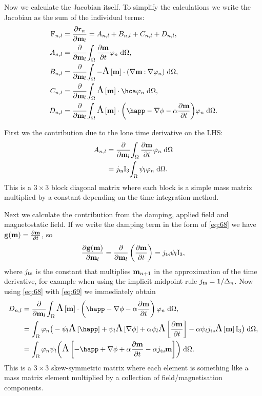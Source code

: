Now we calculate the Jacobian itself. 
To simplify the calculations we write the Jacobian as the sum of the individual terms:
\begin{equation}
  \begin{aligned}
    \Fm_{n,l} &= \pd{\rllgv_n}{\mv_l} = A_{n,l} + B_{n,l} + C_{n,l} + D_{n,l}, \\
    A_{n,l} &= \pd{}{\mv_l} \intd{\dmdt \tbf_n}, \\
    B_{n,l} &= \pd{}{\mv_l} \intd{- \skewm{\mv} \cdot (\grad \mv \compdot \grad \tbf_n)}, \\
    C_{n,l} &= \pd{}{\mv_l} \intd{ \skewm{\mv} \cdot \hca  \tbf_n}, \\
    D_{n,l} &= \pd{}{\mv_l} \intd{  \skewm{\mv} \cdot \bigb{ \happ - \nabla \phi - \dampc \dmdt} \tbf_n}.
  \end{aligned}
\end{equation}

First we the contribution due to the lone time derivative on the LHS:
\begin{equation}
  \begin{aligned}
    A_{n,l} &= \frac{\partial }{\partial \mathbf{m}_l} {\int_{\Omega} { \frac{\partial \mathbf{m}}{\partial t} \varphi_n } {\; \mathrm{{d}}} {\Omega}} \\
           &= j_\mathrm{ts} \mathrm{I}_3 {\int_{\Omega} { \psi_l \varphi_n} {\; \mathrm{{d}}} {\Omega}}.
  \end{aligned}
\end{equation}
This is a $3\times3$ block diagonal matrix where each block is a simple mass matrix multiplied by a constant depending on the time integration method.

Next we calculate the contribution from the damping, applied field and magnetostatic field.
If we write the damping term in the form of \cref{eq:68} we have ${\mathbf{g}}(\mathbf{m}) = \frac{\partial \mathbf{m}}{\partial t}$, so
\begin{equation}
  \label{eq:69}
  \frac{\partial {\mathbf{g}}(\mathbf{m})}{\partial \mathbf{m}_l} = \frac{\partial }{\partial \mathbf{m}_l} \left(\frac{\partial \mathbf{m}}{\partial t} \right) = j_\mathrm{ts} \psi_l \mathrm{I}_3,
\end{equation}
where $j_\mathrm{ts}$ is the constant that multiplies $\mathbf{m}_{n+1}$ in the approximation of the time derivative, for example when using the implicit midpoint rule $j_\mathrm{ts} = 1/\Delta_{n}$.
Now using \cref{eq:68} with \cref{eq:69} we immediately obtain
\begin{equation}
  \begin{aligned} 
    D_{n,l} &= \pd{}{\mv_l} \intd{  \skewm{\mv} \cdot
      \left( \happ - \nabla \phi - \dampc \dmdt
      \right) \tbf_n}, \\
    &= \int_\magd \tbf_n \big( -\sbf_l\skewm{\happ} + \sbf_l\skewm{\nabla \phi} + \dampc\sbf_l \skewm{\dmdt} - \dampc\sbf_l \jts \skewm{\mv} \Idm_3
    \big) \d\magd, \\
    &= \intd{ \tbf_n \sbf_l \bigb{ \skewm{-\happ + \nabla \phi 
          + \dampc \dmdt - \dampc \jts \mv}}}. \\
  \end{aligned}
\end{equation}
This is a $3\times3$ skew-symmetric matrix where each element is something like a mass matrix element multiplied by a collection of field/magnetisation components.

